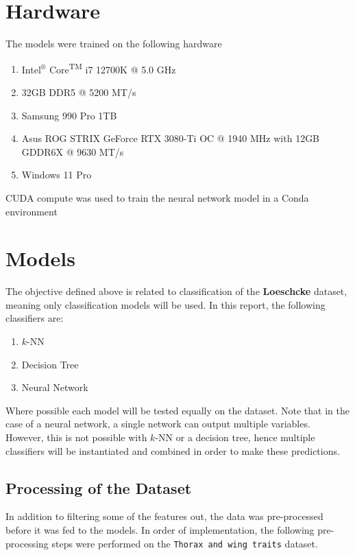 \documentclass{article}
\begin{document}
\newpage
\section{Hardware}

The models were trained on the following hardware

\begin{enumerate}
    \item Intel$^{\circledR}$ Core\textsuperscript{TM} i7 12700K @ 5.0 GHz
    \item 32GB DDR5 @ 5200 MT/s
    \item Samsung 990 Pro 1TB
    \item Asus ROG STRIX GeForce RTX 3080-Ti OC @ 1940 MHz with 12GB GDDR6X @ 9630 MT/s
    \item Windows 11 Pro
\end{enumerate}

CUDA compute was used to train the neural network model in a Conda environment

\bigskip
\section{Models}

The objective defined above is related to classification of the \textbf{Loeschcke} dataset, meaning only classification models will be used. In this report, the following classifiers are:
\begin{enumerate}
    \item $k$-NN
    \item Decision Tree
    \item Neural Network
\end{enumerate}

Where possible each model will be tested equally on the dataset. Note that in the case of a neural network, a single network can output multiple variables. However, this is not possible with $k$-NN or a decision tree, hence multiple classifiers will be instantiated and combined in order to make these predictions.


\newpage
\subsection{Processing of the Dataset}

In addition to filtering some of the features out, the data was pre-processed before it was fed to the models. In order of implementation, the following pre-processing steps were performed on the \texttt{Thorax and wing traits} dataset.
\end{document}
